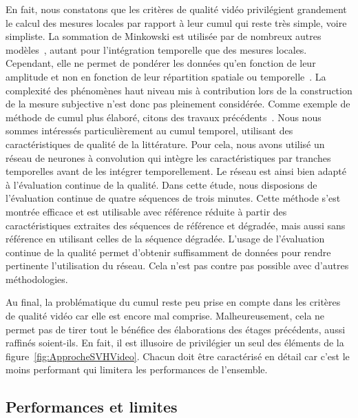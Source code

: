 En fait, nous constatons que les critères de qualité vidéo privilégient grandement le calcul des mesures locales par rapport à leur cumul qui reste très simple, voire simpliste. La sommation de Minkowski est utilisée par de nombreux autres modèles~\cite{deridder-spie1992,lindh-icip1996,lubin-jnd,masry-spic2004}, autant pour l'intégration temporelle que des mesures locales. Cependant, elle ne permet de pondérer les données qu’en fonction de leur amplitude et non en fonction de leur répartition spatiale ou temporelle~\cite{wang-icassp2002}. La complexité des phénomènes haut niveau mis à contribution lors de la construction de la mesure subjective n'est donc pas pleinement considérée. Comme exemple de méthode de cumul plus élaboré, citons des travaux précédents~\cite{lecallet-ieee2006}. Nous nous sommes intéressés particulièrement au cumul temporel, utilisant des caractéristiques de qualité de la littérature. Pour cela, nous avons utilisé un réseau de neurones à convolution qui intègre les caractéristiques par tranches temporelles avant de les intégrer temporellement. Le réseau est ainsi bien adapté à l'évaluation continue de la qualité. Dans cette étude, nous disposions de l'évaluation continue de quatre séquences de trois minutes. Cette méthode s'est montrée efficace et est utilisable avec référence réduite à partir des caractéristiques extraites des séquences de référence et dégradée, mais aussi sans référence en utilisant celles de la séquence dégradée. L'usage de l'évaluation continue de la qualité permet d'obtenir suffisamment de données pour rendre pertinente l'utilisation du réseau. Cela n'est pas contre pas possible avec d'autres méthodologies.

Au final, la problématique du cumul reste peu prise en compte dans les critères de qualité vidéo car elle est encore mal comprise. Malheureusement, cela ne permet pas de tirer tout le bénéfice des élaborations des étages précédents, aussi raffinés soient-ils. En fait, il est illusoire de privilégier un seul des éléments de la figure~\ref{fig:ApprocheSVHVideo}. Chacun doit être caractérisé en détail car c'est le moins performant qui limitera les performances de l'ensemble.


\subsection{Performances et limites}
